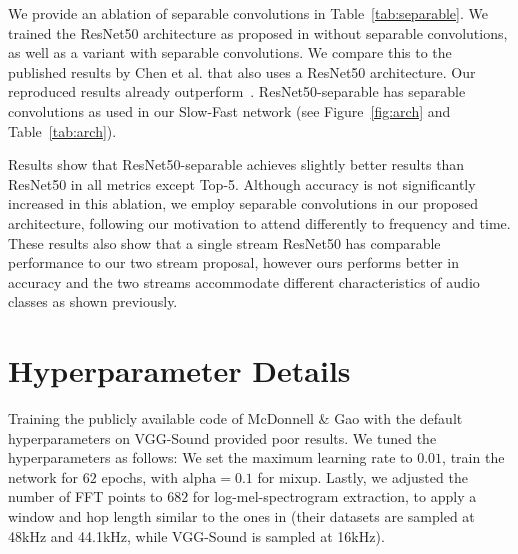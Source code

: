 \documentclass{article}
\begin{document}
We provide an ablation of separable convolutions in Table~\ref{tab:separable}. We trained the ResNet50 architecture as proposed in \cite{He_2016_CVPR} without separable convolutions, as well as a variant with separable convolutions. We compare this to the published results by Chen et al. \cite{vggsound}  that also uses a ResNet50 architecture.
Our reproduced results already outperform~\cite{vggsound}.
ResNet50-separable has separable convolutions as used in our Slow-Fast network (see Figure~\ref{fig:arch} and Table~\ref{tab:arch}). 

Results show that ResNet50-separable achieves slightly better results than ResNet50 in all metrics except Top-5.
Although accuracy is not significantly increased in this ablation, we employ separable convolutions in our proposed architecture, following our motivation to attend differently to frequency and time.
These results also show that a single stream ResNet50 has comparable performance to our two stream proposal, however ours performs better in accuracy and the two streams accommodate different characteristics of audio classes as shown previously. 

\section{Hyperparameter Details}
Training the publicly available code of McDonnell \& Gao \cite{mcdonnell_2020} with the default hyperparameters on VGG-Sound provided poor results. We tuned the hyperparameters as follows: We set the maximum learning rate to $0.01$, train the network for $62$ epochs, with $\text{alpha}=0.1$ for mixup. Lastly, we adjusted the number of FFT points to $682$ for log-mel-spectrogram extraction, to apply a window and hop length similar to the ones in \cite{mcdonnell_2020} (their datasets are sampled at 48kHz and 44.1kHz, while VGG-Sound is sampled at 16kHz).
\end{document}
